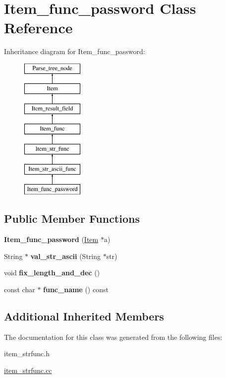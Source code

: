 \hypertarget{classItem__func__password}{}\section{Item\+\_\+func\+\_\+password Class Reference}
\label{classItem__func__password}
Inheritance diagram for Item\+\_\+func\+\_\+password\+:\begin{figure}[H]
\begin{center}
\leavevmode
\includegraphics[height=7.000000cm]{classItem__func__password}
\end{center}
\end{figure}
\subsection*{Public Member Functions}
\begin{DoxyCompactItemize}
\item 
\mbox{\label{classItem__func__password_af62fbfbf506222904ebfa844ae81a335}} 
{\bfseries Item\+\_\+func\+\_\+password} (\mbox{\hyperlink{classItem}{Item}} $\ast$a)
\item 
\mbox{\label{classItem__func__password_af04935c9217fc9da58c80a08873081bc}} 
String $\ast$ {\bfseries val\+\_\+str\+\_\+ascii} (String $\ast$str)
\item 
\mbox{\label{classItem__func__password_a2a528269355251717ddac6309fc5c2f3}} 
void {\bfseries fix\+\_\+length\+\_\+and\+\_\+dec} ()
\item 
\mbox{\label{classItem__func__password_a2b12879039750b80062ccc1db72a9937}} 
const char $\ast$ {\bfseries func\+\_\+name} () const
\end{DoxyCompactItemize}
\subsection*{Additional Inherited Members}


The documentation for this class was generated from the following files\+:\begin{DoxyCompactItemize}
\item 
item\+\_\+strfunc.\+h\item 
\mbox{\hyperlink{item__strfunc_8cc}{item\+\_\+strfunc.\+cc}}\end{DoxyCompactItemize}
